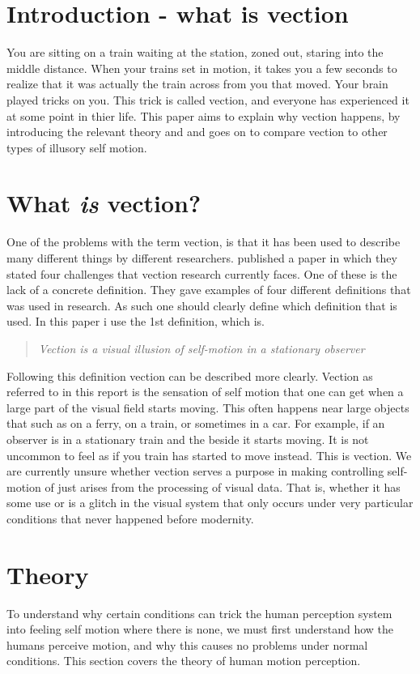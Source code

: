 \documentclass[11pt,a4paper,oneside,table,xcdraw]{article}
\begin{document}



\section{Introduction - what is vection}
You are sitting on a train waiting at the station, zoned out, staring into the middle distance. When your trains set in motion, it takes you a few seconds to realize that it was actually the train across from you that moved. Your brain played tricks on you. This trick is called vection, and everyone has experienced it at some point in thier life. This paper aims to explain why vection happens, by introducing the relevant theory and and goes on to compare vection to other types of illusory self motion. 
\section{What \textit{is} vection?}
One of the problems with the term vection, is that it has been used to describe many different things by different researchers. \cite{challenges} published a paper in which they stated four challenges that vection research currently faces. One of these is the lack of a concrete definition. They gave examples of four different definitions that was used in research. As such one should clearly define which definition that is used. In this paper i use the 1st definition, which is.
\begin{quote}
\textit{Vection is a visual illusion of self-motion in a stationary observer}
	\end{quote}
	Following this definition vection can be described more clearly. Vection as referred to in this report is the sensation of self motion that one can get when a large part of the visual field starts moving. This often happens near large objects that such as on a ferry, on a train, or sometimes in a car. For example, if an observer is in a stationary train and the beside it starts moving. It is not uncommon to feel as if you train has started to move instead. This is vection. We are currently unsure whether vection serves a purpose in making controlling self-motion of just arises from the processing of visual data. That is, whether it has some use or is a glitch in the visual system that only occurs under very particular conditions that never happened before modernity. 
	\section{Theory}
To understand why certain conditions can trick the human perception system into feeling self motion where there is none, we must first understand how the humans perceive motion, and why this causes no problems under normal conditions. This section covers the theory of human motion perception. \\
\end{document}
